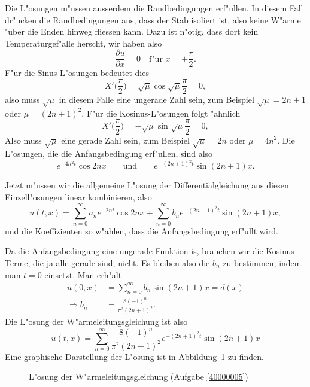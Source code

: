 \begin{loesung}
Die L"osungen m"ussen ausserdem die Randbedingungen erf"ullen.
In diesem Fall dr"ucken die Randbedingungen aus, dass der Stab isoliert ist,
also keine W"arme "uber die Enden hinweg fliessen kann. Dazu ist n"otig,
dass dort kein Temperaturgef"alle herscht, wir haben also
\[\frac{\partial u}{\partial x}=0\quad\text{f"ur $x=\pm\frac{\pi}2$}.\]
F"ur die Sinus-L"osungen bedeutet dies
\[
X'\biggl(\frac{\pi}2\biggr)=\sqrt{\mu}\cos \sqrt{\mu}\frac{\pi}2=0,
\]
also muss $\sqrt{\mu}$ in diesem Falle eine ungerade Zahl sein,
zum Beispiel $\sqrt{\mu}=2n+1$ oder
$\mu=(2n+1)^2$.
F"ur die Kosinus-L"osungen folgt "ahnlich
\[
X'\biggl(\frac{\pi}2\biggr)=-\sqrt{\mu}\sin\sqrt{\mu}\frac{\pi}2=0,
\]
Also muss $\sqrt{\mu}$ eine gerade Zahl sein, zum Beispiel $\sqrt{\mu}=2n$ oder
$\mu=4n^2$.
Die L"osungen, die die Anfangsbedingung
erf"ullen, sind also
\[
e^{-4n^2t}\cos 2nx\qquad\text{und}\qquad e^{-(2n+1)^2t}\sin(2n+1)x.
\]

Jetzt m"ussen wir die allgemeine L"osung der Differentialgleichung aus
diesen Einzell"osungen linear kombinieren, also
\[
u(t,x)=
\sum_{n=0}^\infty a_ne^{-2nt}\cos 2nx +\sum_{n=0}^\infty b_n e^{-(2n+1)^2t}\sin(2n+1)x,
\]
und die Koeffizienten so w"ahlen, dass die Anfangsbedingung erf"ullt wird.

Da die Anfangsbedingung eine ungerade Funktion is, brauchen wir die Kosinus-Terme,
die ja alle gerade sind, nicht. Es bleiben also die $b_n$ zu bestimmen, indem
man $t=0$ einsetzt. Man erh"alt
\begin{align*}
u(0,x)&=\sum_{n=0}^\infty b_n\sin(2n+1)x=d(x)
\\
\Rightarrow
b_n&=\frac{8(-1)^n}{\pi^2(2n+1)^2}.
\end{align*}
Die L"osung der W"armeleitungsgleichung ist also
\[
u(t,x)=
\sum_{n=0}^\infty \frac{8(-1)^n}{\pi^2(2n+1)^2}e^{-(2n+1)^2t}\sin(2n+1)x
\]
Eine graphische Darstellung der L"osung ist in Abbildung~\ref{40000005:bild}
zu finden.
\begin{figure}
\begin{center}
\end{center}
\caption{L"osung der W"armeleitungsgleichung (Aufgabe \ref{40000005})\label{40000005:bild}}
\end{figure}
\end{loesung}
